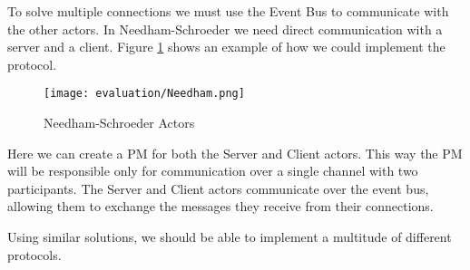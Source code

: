 To solve multiple connections we must use the Event Bus to communicate with the other actors. In Needham-Schroeder we need direct communication with a server and a client. Figure \ref{fig:Needham} shows an example of how we could implement the protocol. 

\begin{figure}[H]
  \centering
  \texttt{[image: evaluation/Needham.png]}
  \caption{Needham-Schroeder Actors}
  \label{fig:Needham}
\end{figure}

Here we can create a PM for both the Server and Client actors. This way the PM will be responsible only for communication over a single channel with two participants. The Server and Client actors communicate over the event bus, allowing them to exchange the messages they receive from their connections.

Using similar solutions, we should be able to implement a multitude of different protocols.

 
\iffalse
If you meet your objectives
How did I test it
How do I know its working What happens when it goes wrong
--- Draft 3 ---
How well were the objectives met
What is the performance compared to no checking
-Does not need to quantifiable
How secure it is
How we set out writing it?
"  made this thing using my DSL"
Performance with different message sizes

Speculate on why a sys is slow



Is scala a good language for building a DSL?

This approach definatly has merrits...


Errors: 

ServerSide => Unspecified case for: PrimeAndGenerator(149.0,2.0)

ClientSide => ValidationError(Msg could not be converted to a PrimeAndGenerator class: ,net.liftweb.json.MappingException: Do not know how to convert JString(239.0) into double)


Server Username => Unspecified case for: LPO2gbvztUktNyx5+BIsidWgBKslDau969BoddEUcs8=
\fi

